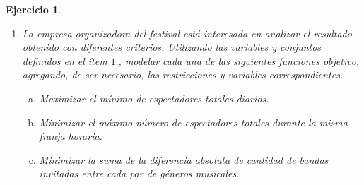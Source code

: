 \documentclass[a4paper,oneside,12pt]{amsart}
\newtheorem{quest}{Ejercicio}
\begin{document}
\begin{quest}
\begin{enumerate}
        \begin{enumerate}[a)]
            \item cada banda invitada debe tocar exactamente durante una franja horaria en exactamente un escenario.
            \item en cada franja horaria, en cada escenario puede tocar a lo sumo una banda.
            \item durante cada franja horaria pueden ocurrir a lo sumo cuatro conciertos simultáneamente.
            \item para cada franja horaria, la cantidad de espectadores del escenario $E_j$ no debe superar su capacidad $\ell_j$.
            \item la cantidad de espectadores totales en cada franja horaria no debe superar 20000.
            \item se deben invitar al menos $g_k$ bandas del género $G_k$.
            \item el escenario $4$ debe permanecer vacío durante la primera franja horaria de cada día.
            \item hay un conjunto $P\subset B$ de bandas muy populares que deben ser invitadas.
            \item cada banda del conjunto $P$ debe tocar durante alguna de las dos últimas franjas horarias de cualquiera de los días.
            \item la ganancia neta del festival debe superar los $R$ pesos.
            \item las bandas invitadas con menos de $S$ espectadores deben tocar durante los primeras tres franjas horarias.
        \end{enumerate}
        \item La empresa organizadora del festival está interesada en analizar el resultado obtenido con diferentes criterios. Utilizando las variables y conjuntos definidos en el ítem $1.$, modelar cada una de las siguientes funciones objetivo, agregando, de ser necesario, las restricciones y variables correspondientes.
        \begin{enumerate}[a)]
            \item Maximizar el mínimo de espectadores totales diarios.
            \item Minimizar el máximo número de espectadores totales durante la misma franja horaria.
            \item Minimizar la suma de la diferencia absoluta de cantidad de bandas invitadas entre cada par de géneros musicales.
        \end{enumerate}
    \end{enumerate}
\end{quest}
\end{document}
